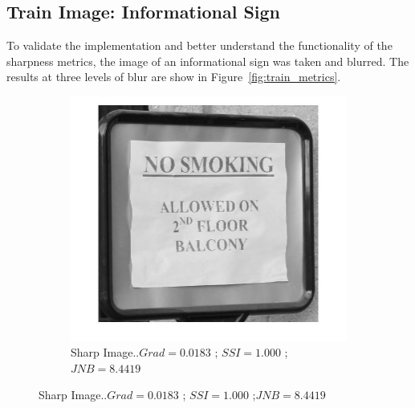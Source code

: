 \subsection{Train Image: Informational Sign}
To validate the implementation and better understand the functionality of the sharpness metrics, the image of an informational sign was taken and blurred. The results at three levels of blur are show in Figure~\ref{fig:train_metrics}.

\begin{figure}[h!]
        \centering
        \begin{subfigure}[b]{0.35\textwidth}
                \centering
                \includegraphics[width=\textwidth]{true.jpg}
                \caption{Sharp Image..\newline $Grad=0.0183$ ; $SSI=1.000$ ;\newline $JNB=8.4419$}
               

\end{subfigure}
\end{figure}
